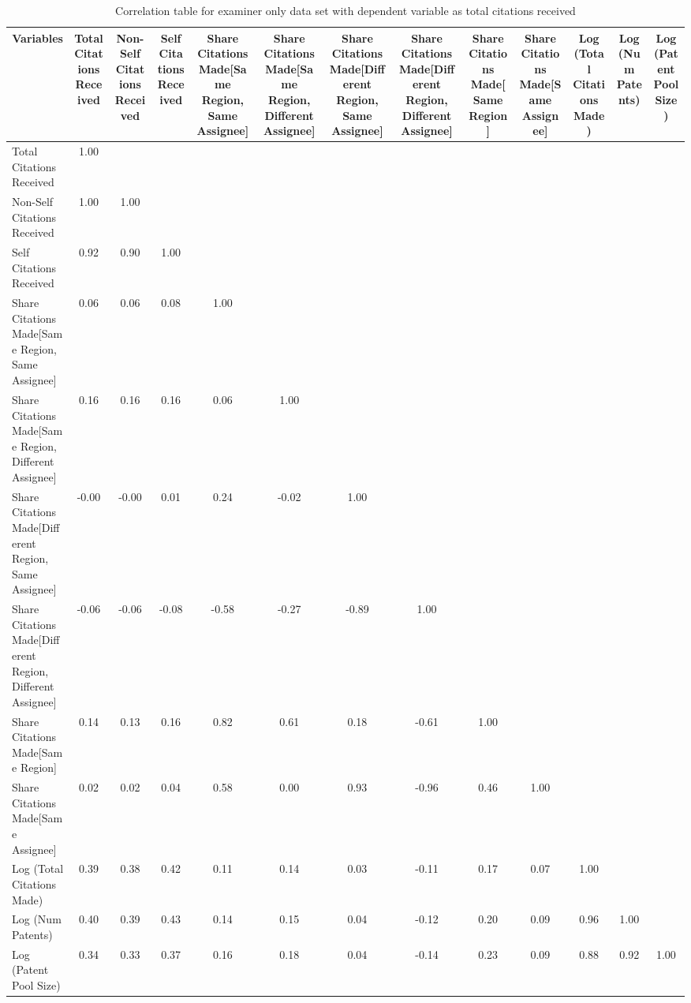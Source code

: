 \begin{table}[htbp]\centering \caption{Correlation table for examiner only data set with dependent variable as total citations received \label{e.tcorrelation}}
\begin{tabular}{l  c  c  c  c  c  c  c  c  c  c  c  c }\hline\hline
\multicolumn{1}{c}{Variables} &Total Citations Received&Non-Self Citations Received&Self Citations Received&Share Citations Made[Same Region, Same Assignee]&Share Citations Made[Same Region, Different Assignee]&Share Citations Made[Different Region, Same Assignee]&Share Citations Made[Different Region, Different Assignee]&Share Citations Made[Same Region]&Share Citations Made[Same Assignee]&Log (Total Citations Made)&Log (Num Patents)&Log (Patent Pool Size)\\ \hline
Total Citations Received&1.00\\
Non-Self Citations Received&1.00&1.00\\
Self Citations Received&0.92&0.90&1.00\\
Share Citations Made[Same Region, Same Assignee]&0.06&0.06&0.08&1.00\\
Share Citations Made[Same Region, Different Assignee]&0.16&0.16&0.16&0.06&1.00\\
Share Citations Made[Different Region, Same Assignee]&-0.00&-0.00&0.01&0.24&-0.02&1.00\\
Share Citations Made[Different Region, Different Assignee]&-0.06&-0.06&-0.08&-0.58&-0.27&-0.89&1.00\\
Share Citations Made[Same Region]&0.14&0.13&0.16&0.82&0.61&0.18&-0.61&1.00\\
Share Citations Made[Same Assignee]&0.02&0.02&0.04&0.58&0.00&0.93&-0.96&0.46&1.00\\
Log (Total Citations Made)&0.39&0.38&0.42&0.11&0.14&0.03&-0.11&0.17&0.07&1.00\\
Log (Num Patents)&0.40&0.39&0.43&0.14&0.15&0.04&-0.12&0.20&0.09&0.96&1.00\\
Log (Patent Pool Size)&0.34&0.33&0.37&0.16&0.18&0.04&-0.14&0.23&0.09&0.88&0.92&1.00\\
\hline \hline 
 \end{tabular}
\end{table}
